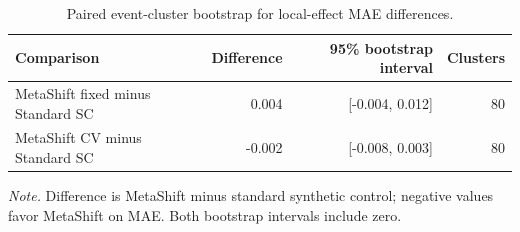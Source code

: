 \begin{table}[!ht]
\centering
\caption{Paired event-cluster bootstrap for local-effect MAE differences.}
\label{tab:paired-bootstrap}
\small
\begin{tabular}{lrrr}
\toprule
Comparison & Difference & 95\% bootstrap interval & Clusters \\
\midrule
MetaShift fixed minus Standard SC & 0.004 & [-0.004, 0.012] & 80 \\
MetaShift CV minus Standard SC & -0.002 & [-0.008, 0.003] & 80 \\
\bottomrule
\end{tabular}
\par\smallskip
\begin{minipage}{0.94\linewidth}
\footnotesize\textit{Note.} Difference is MetaShift minus standard synthetic control; negative values favor MetaShift on MAE. Both bootstrap intervals include zero.
\end{minipage}
\end{table}
